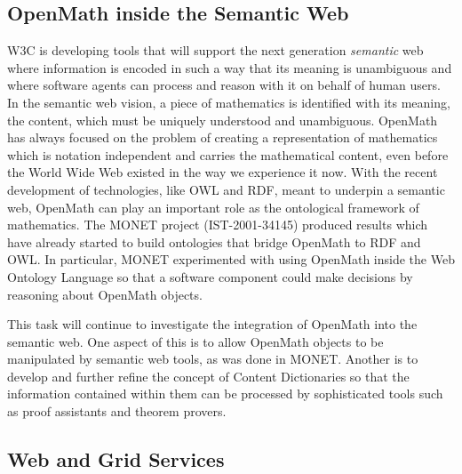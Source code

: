 \documentclass{euproposal}
\begin{document}
\subsection{OpenMath inside the Semantic Web}

W3C is developing tools that will support the next generation
\emph{semantic} web where information is encoded in such a way that
its meaning is unambiguous and where software agents can process and
reason with it on behalf of human users.  In the semantic web vision,
a piece of mathematics is identified with its meaning, the content,
which must be uniquely understood and unambiguous.  OpenMath has
always focused on the problem of creating a representation of
mathematics which is notation independent and carries the mathematical
content, even before the World Wide Web existed in the way we
experience it now. With the recent development of technologies, like
OWL and RDF, meant to underpin a semantic web, OpenMath can play an
important role as the ontological framework of mathematics. The MONET
project (IST-2001-34145) produced results which have already started
to build ontologies that bridge OpenMath to RDF and OWL.  In
particular, MONET experimented with using OpenMath inside the Web
Ontology Language so that a software component could make decisions by
reasoning about OpenMath objects.

This task will continue to investigate the integration of OpenMath
into the semantic web.  One aspect of this is to allow OpenMath
objects to be manipulated by semantic web tools, as was done in MONET.
Another is to develop and further refine the concept of Content
Dictionaries so that the information contained within them can be
processed by sophisticated tools such as proof assistants and theorem
provers.

\subsection{Web and Grid Services}


\end{document}
